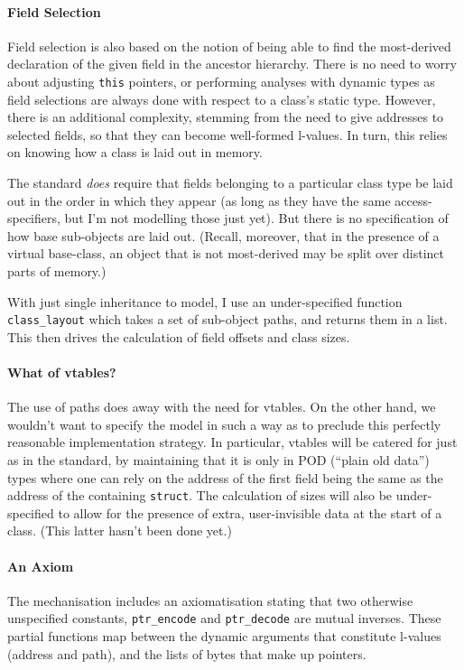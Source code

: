 \documentclass[11pt]{article}
\begin{document}
\paragraph{Field Selection}
Field selection is also based on the notion of being able to find the
most-derived declaration of the given field in the ancestor hierarchy.
There is no need to worry about adjusting \texttt{this} pointers, or
performing analyses with dynamic types as field selections are always
done with respect to a class's static type.  However, there is an
additional complexity, stemming from the need to give addresses to
selected fields, so that they can become well-formed l-values.  In
turn, this relies on knowing how a class is laid out in memory.

The standard \emph{does} require that fields belonging to a particular
class type be laid out in the order in which they appear (as long as
they have the same access-specifiers, but I'm not modelling those just
yet).  But there is no specification of how base sub-objects are laid
out.  (Recall, moreover, that in the presence of a virtual base-class,
an object that is not most-derived may be split over distinct parts of
memory.)

With just single inheritance to model, I use an under-specified
function \texttt{class\_layout} which takes a set of sub-object paths,
and returns them in a list.  This then drives the calculation of field
offsets and class sizes.

\paragraph{What of vtables?}
The use of paths does away with the need for vtables.  On the other
hand, we wouldn't want to specify the model in such a way as to
preclude this perfectly reasonable implementation strategy.  In
particular, vtables will be catered for just as in the standard, by
maintaining that it is only in POD (``plain old data'') types where
one can rely on the address of the first field being the same as the
address of the containing \texttt{struct}.  The calculation of sizes
will also be under-specified to allow for the presence of extra,
user-invisible data at the start of a class.  (This latter hasn't been
done yet.)

\paragraph{An Axiom}
The mechanisation includes an axiomatisation stating that two
otherwise unspecified constants, \texttt{ptr\_encode} and
\texttt{ptr\_decode} are mutual inverses.  These partial functions map
between the dynamic arguments that constitute l-values (address and
path), and the lists of bytes that make up pointers.
\end{document}
